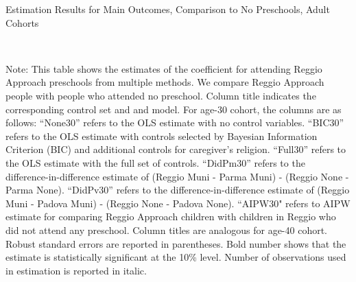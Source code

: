 \begin{landscape}
\begin{table}[H] \caption{Estimation Results for Main Outcomes, Comparison to No Preschools, Adult Cohorts} \label{ols-M-adult-reg-nopres}
\scalebox{0.75}{}
\vspace{1ex} \\
\footnotesize\raggedright{Note: This table shows the estimates of the coefficient for attending Reggio Approach preschools from multiple methods. We compare Reggio Approach people with people who attended no preschool. Column title indicates the corresponding control set and and model. For age-30 cohort, the columns are as follows: ``None30'' refers to the OLS estimate with no control variables. ``BIC30'' refers to the OLS estimate with controls selected by Bayesian Information Criterion (BIC) and additional controls for caregiver's religion. ``Full30'' refers to the OLS estimate with the full set of controls. ``DidPm30'' refers to the difference-in-difference estimate of (Reggio Muni - Parma Muni) - (Reggio None - Parma None). ``DidPv30'' refers to the difference-in-difference estimate of (Reggio Muni - Padova Muni) - (Reggio None - Padova None).  ``AIPW30" refers to AIPW estimate for comparing Reggio Approach children with children in Reggio who did not attend any preschool. Column titles are analogous for age-40 cohort. Robust standard errors are reported in parentheses. Bold number shows that the estimate is statistically significant at the 10\% level. Number of observations used in estimation is reported in italic.}
\end{table}

\end{landscape}
